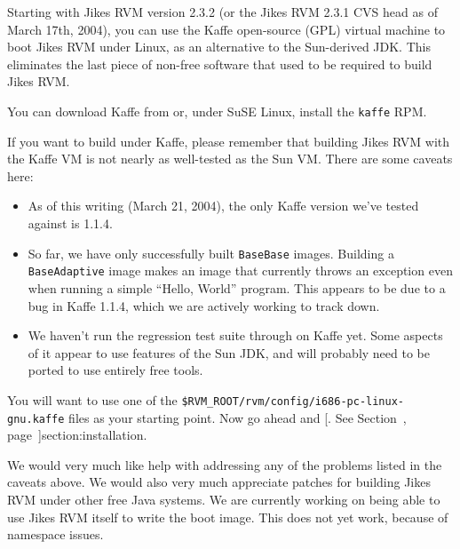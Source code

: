 Starting with Jikes RVM version 2.3.2 (or the Jikes RVM 2.3.1 CVS head
as of March 17th, 2004), you can use the Kaffe open-source (GPL)
virtual machine to boot Jikes RVM under Linux, as an alternative to
the Sun-derived JDK.  This eliminates the last piece of non-free
software that used to be required to build Jikes RVM.

You can download Kaffe from \xlink{{\tt \KaffeURL}}{\KaffeURL} or,
under SuSE Linux, install the {\tt kaffe} RPM.  

If you want to build under Kaffe, please remember that building Jikes
RVM with the Kaffe VM is not nearly as well-tested as the Sun VM.
There are some caveats here:

\begin{itemize}

\item As of this writing (March 21, 2004), the only Kaffe version we've
tested against is 1.1.4.  

\item So far, we have only successfully built {\tt BaseBase}{\it *}
  images.  Building a \texttt{BaseAdaptive}{\it *} image makes an
  image that currently throws an exception even when running a simple
  ``Hello, World'' program.  This appears to be due to a bug in Kaffe
  1.1.4, which we are actively working to track down.

\item We haven't run the regression test suite through on Kaffe yet.
  Some aspects of it appear to use features of the Sun JDK, and will
  probably need to be ported to use entirely free tools.

\end{itemize}

You will want to use one of the 
{\tt \$RVM\_\-ROOT/rvm/config/i686-pc-linux-gnu.kaffe{\it *}} files as
your starting point.  Now go ahead and [.  
  See Section~\Ref, page~\Pageref]{section:installation}. 

We would very much like help with addressing any of the problems
listed in the caveats above.  We would also very much appreciate
patches for building Jikes RVM under other free Java systems.  We are
currently working on being able to use Jikes RVM itself to write the
boot image.  This does not yet work, because of namespace issues.

